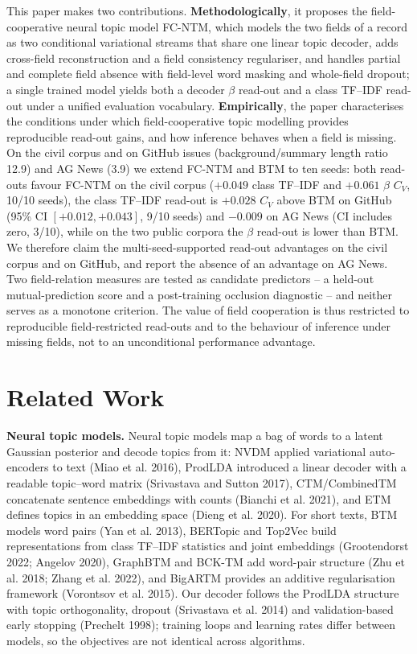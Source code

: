 \documentclass[Journal,letterpaper,NoLists]{ascelike-new}
\begin{document}
This paper makes two contributions. \textbf{Methodologically}, it proposes the field-cooperative
neural topic model FC-NTM, which models the two fields of a record as two conditional variational
streams that share one linear topic decoder, adds cross-field reconstruction and a field
consistency regulariser, and handles partial and complete field absence with field-level word
masking and whole-field dropout; a single trained model yields both a decoder $\beta$ read-out and
a class TF--IDF read-out under a unified evaluation vocabulary. \textbf{Empirically}, the paper characterises the conditions under which field-cooperative topic
modelling provides reproducible read-out gains, and how inference behaves when a field is missing.
On the civil corpus and on GitHub issues (background/summary length ratio 12.9) and AG News (3.9)
we extend FC-NTM and BTM to ten seeds: both read-outs favour FC-NTM on the civil corpus
($+0.049$ class TF--IDF and $+0.061$ $\beta$ $C_V$, 10/10 seeds), the class TF--IDF read-out is
$+0.028$ $C_V$ above BTM on GitHub (95\% CI $[+0.012,+0.043]$, 9/10 seeds) and $-0.009$ on AG News
(CI includes zero, 3/10), while on the two public corpora the $\beta$ read-out is lower than BTM.
We therefore claim the multi-seed-supported read-out advantages on the civil corpus and on GitHub,
and report the absence of an advantage on AG News. Two field-relation measures
are tested as candidate predictors -- a held-out mutual-prediction score and a post-training
occlusion diagnostic -- and neither serves as a monotone criterion. The value of field cooperation
is thus restricted to reproducible field-restricted read-outs and to the behaviour of inference
under missing fields, not to an unconditional performance advantage.

\section{Related Work}

\noindent\textbf{Neural topic models.} Neural topic models map a bag of words to a latent Gaussian posterior and decode topics from it:
NVDM applied variational auto-encoders to text (Miao et al. 2016), ProdLDA introduced a linear
decoder with a readable topic--word matrix (Srivastava and
  Sutton 2017), CTM/CombinedTM concatenate
sentence embeddings with counts (Bianchi et al. 2021), and ETM defines topics in an embedding space
(Dieng et al. 2020). For short texts, BTM models word pairs (Yan et al. 2013), BERTopic and Top2Vec
build representations from class TF--IDF statistics and joint embeddings
(Grootendorst 2022; Angelov 2020), GraphBTM and BCK-TM add word-pair structure
(Zhu et al. 2018; Zhang et al. 2022), and BigARTM provides an additive regularisation framework
(Vorontsov
  et al. 2015). Our decoder follows the ProdLDA structure with topic orthogonality,
dropout (Srivastava
  et al. 2014) and validation-based early stopping (Prechelt 1998);
training loops and learning rates differ between models, so the objectives are not identical
across algorithms.
\end{document}
